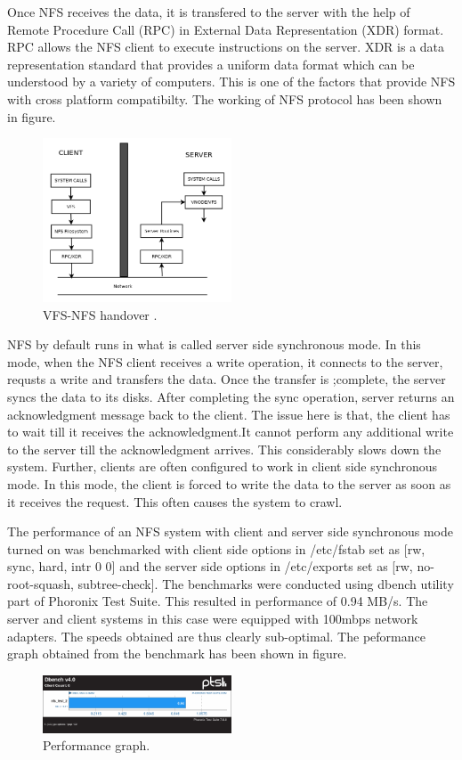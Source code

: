 \documentclass[conference]{IEEEtran}
\begin{document}
Once NFS receives the data, it is transfered to the server with the help of
Remote Procedure Call (RPC) in External Data Representation (XDR) format.
RPC allows the NFS client to execute instructions on the server. XDR is a
data representation standard that provides a uniform data format which can
be understood by a variety of computers. This is one of the factors that
provide NFS with cross platform compatibilty. The working of NFS protocol
has been shown in figure.
\begin{figure}[htbp]
\centerline{\includegraphics[width=0.5\textwidth,natwidth=400,natheight=300]{Diagram1.png}}
\caption{VFS-NFS handover .}
\label{fig}
\end{figure}
NFS by default runs in what is called server side synchronous mode. In this
mode, when the NFS client receives a write operation, it connects to the
server, requsts a write and transfers the data. Once the transfer is
;complete, the server syncs the data to its disks. After completing the sync
operation, server returns an acknowledgment message back to the client. The
issue here is that, the client has to wait till it receives the 
acknowledgment.It cannot perform any additional write to the server till the
acknowledgment arrives. This considerably slows down the system. Further,
clients are often configured to work in client side synchronous mode.
In this mode, the client is forced to write the data to the server as
soon as it receives the request. This often causes the system to crawl.

The performance of an NFS system with client and server side synchronous
mode turned on was benchmarked with client side options in /etc/fstab set as
[rw, sync, hard, intr 0 0] and the server side options  in /etc/exports set
as [rw, no-root-squash, subtree-check]. The benchmarks were conducted using
dbench utility part of Phoronix Test Suite. This resulted in performance of
0.94 MB/s. The server and client systems in this case were equipped with
100mbps network adapters. The speeds obtained are thus clearly sub-optimal.
The peformance graph obtained from the benchmark has been shown in figure.
\begin{figure}[htbp]
\centerline{\includegraphics[width=0.5\textwidth,natwidth=400,natheight=50]{nfs_working_fig_2.png}}
\caption{Performance graph.}
\label{fig}
\end{figure}
\end{document}
